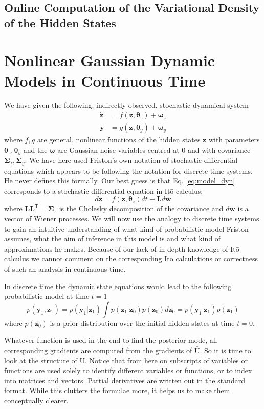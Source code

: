 \documentclass[a4paper,10pt]{article}
\newcommand{\bs}[1]{\mathbf{#1}}					%
\newcommand{\bgs}[1]{\boldsymbol{#1}}				%
\newcommand{\tr}{\mathsf{T}}				%
\newcommand{\eq}[1]{\begin{equation} #1 \end{equation}}%
\renewcommand{\ss}{z}         %
\newcommand{\so}{y}         %
\newcommand{\sn}{\omega} %
\renewcommand{\sp}{\theta}    %
\newcommand{\ps}{\bs{\ss}}    %
\newcommand{\po}{\bs{\so}}    %
\newcommand{\pn}{\bgs{\sn}} %
\newcommand{\pp}{\bgs{\sp}} %
\newcommand{\Ua}{\bar{\mathrm{U}}}		%
\newcommand{\Cov}{\bgs{\Sigma}}			%
\begin{document}
\subsection{Online Computation of the Variational Density of the Hidden States}



\section{Nonlinear Gaussian Dynamic Models in Continuous Time}
We have given the following, indirectly observed, stochastic dynamical system
\begin{align}
    \label{eq:model_dyn}\dot{\ps} &= f(\ps, \pp_{\ss}) + \pn_{\ss}\\
    \po &= g(\ps, \pp_{\so}) + \pn_{\so}
\end{align}
where $f, g$ are general, nonlinear functions of the hidden states $\ps$ with parameters $\pp_{\ss}, \pp_{\so}$ and the $\pn$ are Gaussian noise variables centred at 0 and with covariance $\Cov_{\ss}, \Cov_{\so}$. We have here used Friston's own notation of stochastic differential equations which appears to be following the notation for discrete time systems. He never defines this formally. Our best guess is that Eq. \ref{eq:model_dyn} corresponds to a stochastic differential equation in It\={o} calculus:
\[
    d\ps = f(\ps, \pp_{\ss})dt + \bs{L}d\bs{w}
\]
where $\bs{L}\bs{L}^\tr = \Cov_{\ss}$ is the Cholesky decomposition of the covariance and $d\bs{w}$ is a vector of Wiener processes. We will now use the analogy to discrete time systems to gain an intuitive understanding of what kind of probabilistic model Friston assumes, what the aim of inference in this model is and what kind of approximations he makes. Because of our lack of in depth knowledge of It\={o} calculus we cannot comment on the corresponding It\={o} calculations or correctness of such an analysis in continuous time.

In discrete time the dynamic state equations would lead to the following probabilistic model at time $t=1$
\eq{
    p(\po_1, \ps_1) = p(\po_1| \ps_1)\int p(\ps_1|\ps_0)p(\ps_0) d\ps_0 = p(\po_1| \ps_1)p(\ps_1)
}
where $p(\ps_0)$ is a prior distribution over the initial hidden states at time $t=0$.

Whatever function is used in the end to find the posterior mode, all corresponding gradients are computed from the gradients of $\Ua$. So it is time to look at the structure of $\Ua$. Notice that from here on subscripts of variables or functions are used solely to identify different variables or functions, or to index into matrices and vectors. Partial derivatives are written out in the standard format. While this clutters the formulae more, it helps us to make them conceptually clearer.
\end{document}
